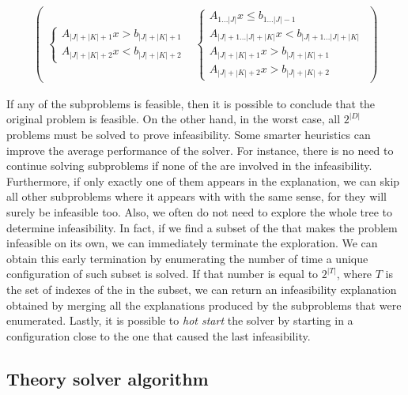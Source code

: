 \documentclass[runningheads]{llncs}
\begin{document}
\begin{equation}
\begin{gathered}
\begin{pmatrix}
\begin{cases}
                A_{|J| + |K| + 1} x > b_{|J| + |K| + 1}                   \\
                A_{|J| + |K| + 2} x < b_{|J| + |K| + 2}
            \end{cases}
             &
            \begin{cases}
                A_{1 \dots |J|} x \le b_{1 \dots |J| - 1}                 \\
                A_{|J| + 1\dots |J| + |K|} x < b_{|J| + 1\dots |J| + |K|} \\
                A_{|J| + |K| + 1} x > b_{|J| + |K| + 1}                   \\
                A_{|J| + |K| + 2} x > b_{|J| + |K| + 2}
            \end{cases}
        \end{pmatrix}
    \end{gathered}
\end{equation}

If any of the subproblems is feasible, then it is possible to conclude that the original problem is feasible.
On the other hand, in the worst case, all $2^{|D|}$ problems must be solved to prove infeasibility.
Some smarter heuristics can improve the average performance of the solver.
For instance, there is no need to continue solving subproblems if none of the \nqcs are involved in the infeasibility.
Furthermore, if only exactly one of them appears in the explanation, we can skip all other subproblems where it appears with with the same sense, for they will surely be infeasible too.
Also, we often do not need to explore the whole tree to determine infeasibility.
In fact, if we find a subset of the \nqc that makes the problem infeasible on its own, we can immediately terminate the exploration.
We can obtain this early termination by enumerating the number of time a unique configuration of such subset is solved.
If that number is equal to $2^{|T|}$, where $T$ is the set of indexes of the \nqcs in the subset, we can return an infeasibility explanation obtained by merging all the explanations produced by the subproblems that were enumerated.
Lastly, it is possible to \textit{hot start} the solver by starting in a configuration close to the one that caused the last infeasibility.

\subsection{Theory solver algorithm}
\end{document}
